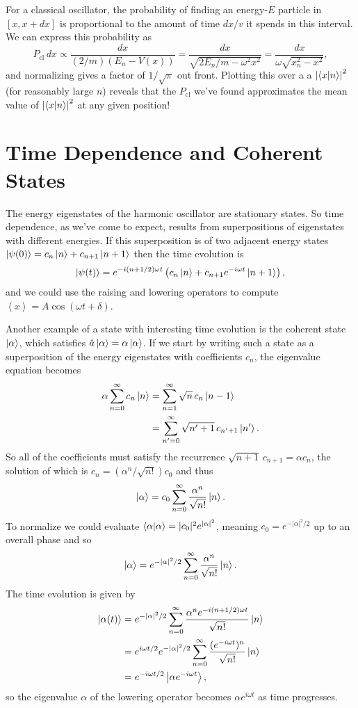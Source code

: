 \documentclass[../p116main.tex]{subfiles}
\begin{document}
For a classical oscillator, the probability of finding an energy-$E$ particle in $[x, x + dx]$ is proportional to the amount of time $dx / v$ it spends in this interval.
We can express this probability as
\[ P_\textrm{cl} \, dx \propto \frac{dx}{(2 / m)(E_n - V(x))} = \frac{dx}{\sqrt{2 E_n / m - \omega^2 x^2}} = \frac{dx}{\omega \sqrt{x_n^2 - x^2}}, \]
and normalizing gives a factor of $1 / \sqrt{\pi}$ out front.
Plotting this over a a $\left| \left< x \middle| n \right> \right|^2$ (for reasonably large $n$) reveals that the $P_\text{cl}$ we've found approximates the mean value of $\left| \left< x \middle| n \right> \right|^2$ at any given position!

\section{Time Dependence and Coherent States}
The energy eigenstates of the harmonic oscillator are stationary states.
So time dependence, as we've come to expect, results from superpositions of eigenstates with different energies.
If this superposition is of two adjacent energy states $\left| \psi(0) \right> = c_n \left| n \right> + c_{n+1} \left| n+1 \right>$ then the time evolution is
\[ \left| \psi(t) \right> = e^{-i(n + 1 / 2) \omega t} \left( c_n \left| n \right> + c_{n+1} e^{-i\omega t} \left| n+1 \right> \right), \]
and we could use the raising and lowering operators to compute $\left< x \right> = A \cos(\omega t + \delta)$.

Another example of a state with interesting time evolution is the coherent state $\left| \alpha \right>$, which satisfies $\hat a \left| \alpha \right> = \alpha \left| \alpha \right>$.
If we start by writing such a state as a superposition of the energy eigenstates with coefficients $c_n$, the eigenvalue equation becomes   \vspace{-6pt}
\begin{align*}
    \alpha \sum_{n=0}^{\infty} c_n \left| n \right> &= \sum_{n=1}^{\infty} \sqrt{n} \,c_n \left| n-1 \right> \\
    &= \sum_{n'=0}^{\infty} \sqrt{n'+1} \,c_{n'+1} \left| n' \right>.
\end{align*}
So all of the coefficients must satisfy the recurrence $\sqrt{n+1} \, c_{n+1} = \alpha c_n$, the solution of which is $c_n = (\alpha^n / \sqrt{n!}) c_0$ and thus
\[ \left| \alpha \right> = c_0 \sum_{n=0}^{\infty} \frac{\alpha^n}{\sqrt{n!}} \left| n \right>. \]
To normalize we could evaluate $\left< \alpha \middle| \alpha \right> = |c_0|^2 e^{|\alpha|^2}$, meaning $c_0 = e^{-|\alpha|^2 / 2}$ up to an overall phase and so
\[ \left| \alpha \right> = e^{-|\alpha|^2 / 2} \sum_{n=0}^{\infty} \frac{\alpha^{n}}{\sqrt{n!}} \left| n \right>. \]
The time evolution is given by
\begin{align*}
    \left| \alpha(t) \right> &= e^{-|\alpha|^2 / 2} \sum_{n=0}^{\infty} \frac{\alpha^{n} e^{-i(n + 1 / 2) \omega t}}{\sqrt{n!}} \left| n \right> \\
    &= e^{i \omega t / 2} e^{-|\alpha|^2 / 2} \sum_{n=0}^{\infty} \frac{( e^{-i \omega t})^{n}}{\sqrt{n!}} \left| n \right> \\
    &= e^{-i \omega t / 2} \left| \alpha e^{-i \omega t} \right>,
\end{align*}
so the eigenvalue $\alpha$ of the lowering operator becomes $\alpha e^{i \omega t}$ as time progresses.
\end{document}
